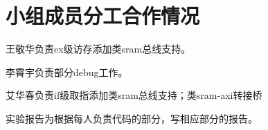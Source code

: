\documentclass[11pt]{article}
\begin{document}
      
\vspace{1ex}

\section{小组成员分工合作情况}
王敬华负责ex级访存添加类sram总线支持。

李霄宇负责部分debug工作。

艾华春负责if级取指添加类sram总线支持；类sram-axi转接桥

实验报告为根据每人负责代码的部分，写相应部分的报告。
\end{document}
